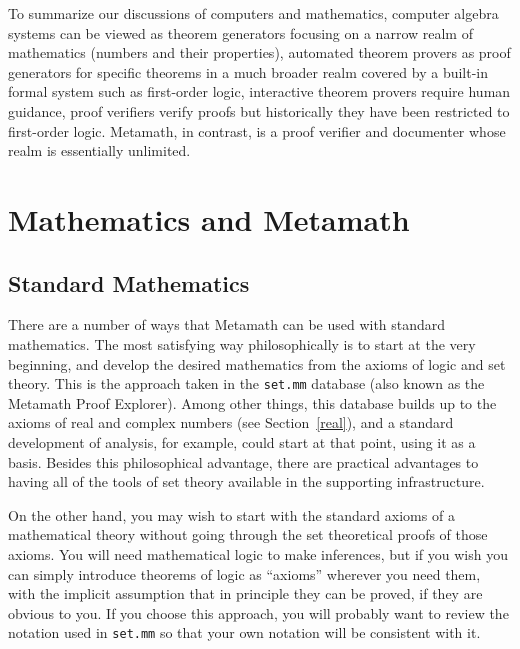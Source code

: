 To summarize our discussions of computers and mathematics, computer algebra
systems can be viewed as theorem generators focusing on a narrow realm of
mathematics (numbers and their properties), automated theorem provers as proof
generators for specific theorems in a much broader realm covered by a built-in
formal system such as first-order logic, interactive theorem
provers require human guidance, proof verifiers verify proofs but
historically they have been
restricted to first-order logic.
Metamath, in contrast,
is a proof verifier and documenter whose realm is essentially unlimited.

\section{Mathematics and Metamath}

\subsection{Standard Mathematics}

There are a number of ways that Metamath can be used with
standard mathematics.  The most satisfying way philosophically is to start at
the very beginning, and develop the desired mathematics from the axioms of
logic and set theory.  This is the approach taken in the
\texttt{set.mm}%
database (also known as the Metamath Proof Explorer).
Among other things, this database builds up to the
axioms of real and complex numbers (see Section~\ref{real}), and a standard development of analysis, for
example, could start at that point, using it as a basis.   Besides this
philosophical advantage, there are practical advantages to having all of the
tools of set theory available in the supporting infrastructure.

On the other hand, you may wish to start with the standard axioms of a
mathematical theory without going through the set theoretical proofs of those
axioms.  You will need mathematical logic to make inferences, but if you wish
you can simply introduce theorems of logic as
``axioms'' wherever you need them, with the implicit assumption
that in principle they can be proved, if they are obvious to you.  If you
choose this approach, you will probably want to review the notation used in
\texttt{set.mm} so that your own
notation will be consistent with it.

